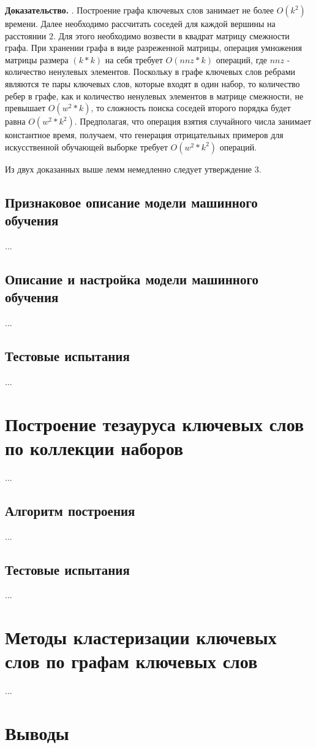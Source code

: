 \textbf{Доказательство.} 
. Построение графа ключевых слов занимает не более $O(k^2)$ времени. Далее необходимо рассчитать соседей для каждой вершины на расстоянии $2$. Для этого необходимо возвести в квадрат матрицу смежности графа. При хранении графа в виде разреженной матрицы, операция умножения матрицы размера $(k*k)$ на себя требует $O(nnz * k)$ операций, где $nnz$ - количество ненулевых элементов. Поскольку в графе ключевых слов ребрами являются те пары ключевых слов, которые входят в один набор, то количество ребер в графе, как и количество ненулевых элементов в матрице смежности, не превышает $O(w^2 * k)$, то сложность поиска соседей второго порядка будет равна $O(w^2 * k^2)$. Предполагая, что операция взятия случайного числа занимает константное время, получаем, что генерация отрицательных примеров для искусственной обучающей выборке требует $O(w^2 * k^2)$ операций.

Из двух доказанных выше лемм немедленно следует утверждение 3.

\subsection{Признаковое описание модели машинного обучения}
...
\subsection{Описание и настройка модели машинного обучения}
...

\subsection{Тестовые испытания}
...
\section{Построение тезауруса ключевых слов по коллекции наборов}
...
\subsection{Алгоритм построения}
...
\subsection{Тестовые испытания}
...
\section{Методы кластеризации ключевых слов по графам ключевых слов}
...
\section{Выводы}
